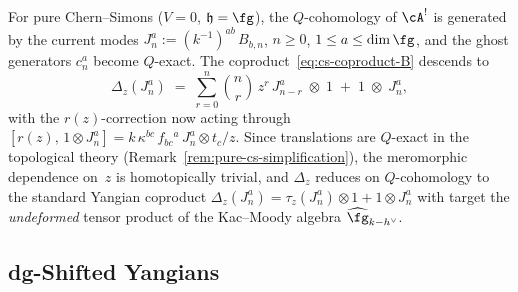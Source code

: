 \begin{remark}
\label{rem:cs-current-coproduct}
For pure Chern--Simons ($V = 0$, $\mathfrak{h} = \fg$), the
$Q$-cohomology of $\cA^!$ is generated by the current modes
$J^a_n := (k^{-1})^{ab}\,B_{b,n}$, $n \ge 0$,
$1 \le a \le \dim\fg$, and the ghost generators $c^a_n$ become
$Q$-exact. The coproduct~\eqref{eq:cs-coproduct-B} descends to
\begin{equation}\label{eq:current-coproduct}
 \Delta_z(J^a_n)
 \;=\;
 \sum_{r=0}^{n} \binom{n}{r}\, z^r\, J^a_{n-r}
 \;\otimes\; 1
 \;+\;
 1 \;\otimes\; J^a_n,
\end{equation}
with the $r(z)$-correction now acting through
$[r(z),\, 1 \otimes J^a_n]
= k\,\kappa^{bc}\,f_{bc}{}^a\,J^a_n \otimes t_c/z$.
Since translations are $Q$-exact in the topological theory
(Remark~\ref{rem:pure-cs-simplification}), the meromorphic
dependence on~$z$ is homotopically trivial, and
$\Delta_z$ reduces on $Q$-cohomology to the
standard Yangian coproduct $\Delta_z(J^a_n)
= \tau_z(J^a_n) \otimes 1 + 1 \otimes J^a_n$
with target the \emph{undeformed} tensor product of the
Kac--Moody algebra $\widehat{\fg}_{k - h^\vee}$.
\end{remark}

\subsection{dg-Shifted Yangians}
\label{subsec:dg-yangian-operadic}


